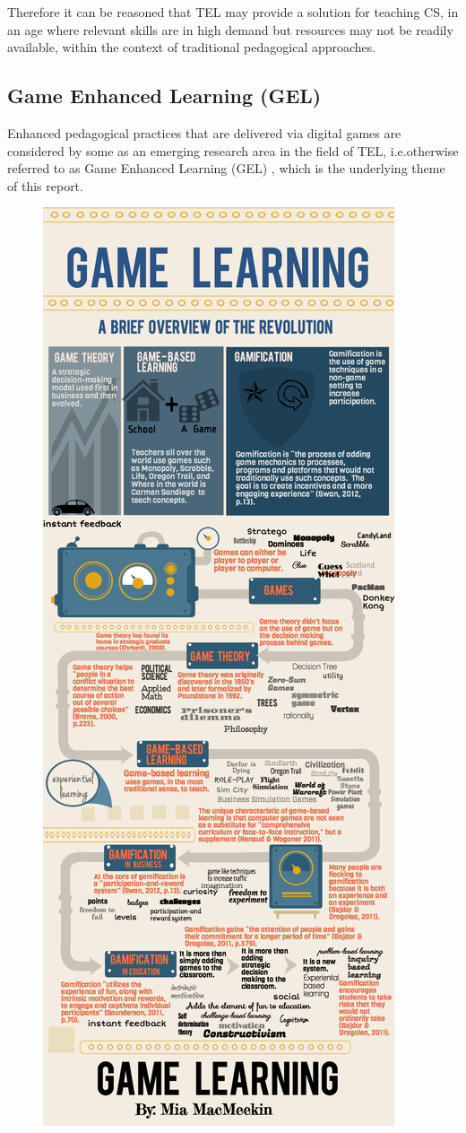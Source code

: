  Therefore it can be reasoned that TEL may provide a solution for teaching CS, in an age where relevant skills are in high demand but resources may not be readily available, within the context of traditional pedagogical approaches.
 
\subsection{Game Enhanced Learning (GEL)}
Enhanced pedagogical practices that are delivered via digital games are considered by some as an emerging research area in the field of TEL, i.e.otherwise referred to as Game Enhanced Learning (GEL) \cite{GEL}, which is the underlying theme of this report.
\label{subsec:subsec01}
\begin{figure}[h]
    \centering
    \includegraphics[scale=0.22]{fig01/GELInfograph}

\end{figure}
